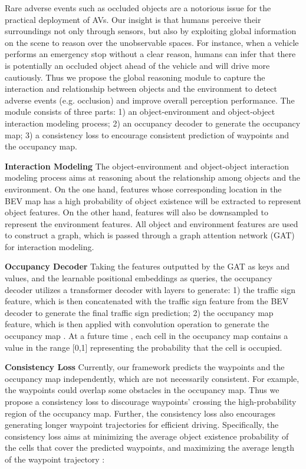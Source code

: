 \documentclass[10pt,twocolumn,letterpaper]{article}
\begin{document}
Rare adverse events such as occluded objects are a notorious issue for the practical deployment of AVs. Our insight is that humans perceive their surroundings not only through sensors, but also by exploiting global information on the scene to reason over the unobservable spaces. For instance, when a vehicle performs an emergency stop without a clear reason, humans can infer that there is potentially an occluded object ahead of the vehicle and will drive more cautiously. Thus we propose the global reasoning module to capture the interaction and relationship between objects and the environment to detect adverse events (e.g. occlusion) and improve overall perception performance. The module consists of three parts: 1) an object-environment and object-object interaction modeling process; 2) an occupancy decoder to generate the occupancy map; 3) a consistency loss to encourage consistent prediction of waypoints and the occupancy map.


\noindent\textbf{Interaction Modeling} The object-environment and object-object interaction modeling process aims at reasoning about the relationship among objects and the environment. On the one hand,  features whose corresponding location in the BEV map  has a high probability of object existence will be extracted to represent object features. On the other hand,  features will also be downsampled to represent the environment features. All object and environment features are used to construct a graph, which is passed through a graph attention network (GAT)~\cite{velickovic2017graph} for interaction modeling.

\noindent\textbf{Occupancy Decoder} Taking the features outputted by the GAT as keys and values, and the learnable positional embeddings as queries, the occupancy decoder utilizes a transformer decoder with  layers to generate: 1) the traffic sign feature, which is then concatenated with the traffic sign feature from the BEV decoder to generate the final traffic sign prediction; 2) the occupancy map feature, which is then applied with convolution operation to generate the occupancy map . At a future time , each cell in the occupancy map contains a value in the range [0,1] representing the probability that the cell is occupied.

\noindent\textbf{Consistency Loss} Currently, our framework predicts the waypoints and the occupancy map independently, which are not necessarily consistent. For example, the waypoints could overlap some obstacles in the occupancy map. Thus we propose a consistency loss to discourage waypoints' crossing the high-probability region of the occupancy map. Further, the consistency loss also encourages generating longer waypoint trajectories for efficient driving. Specifically, the consistency loss aims at minimizing the average object existence probability of the cells that cover the predicted waypoints, and maximizing the average  length of the waypoint trajectory :
\end{document}
